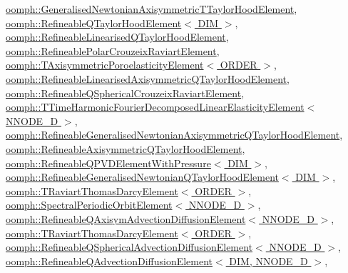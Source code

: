 \hyperlink{classoomph_1_1GeneralisedNewtonianAxisymmetricTTaylorHoodElement_adcb0106a988171745cb375a4ba11658e}{oomph\+::\+Generalised\+Newtonian\+Axisymmetric\+T\+Taylor\+Hood\+Element}, \hyperlink{classoomph_1_1RefineableQTaylorHoodElement_a44ffd481fbc9e2538500a150d7ced7aa}{oomph\+::\+Refineable\+Q\+Taylor\+Hood\+Element$<$ D\+I\+M $>$}, \hyperlink{classoomph_1_1RefineableLinearisedQTaylorHoodElement_a086b235ae15bc49e1043ae6f09217ae9}{oomph\+::\+Refineable\+Linearised\+Q\+Taylor\+Hood\+Element}, \hyperlink{classoomph_1_1RefineablePolarCrouzeixRaviartElement_a7425e9813dccd141f9a377d6478876f2}{oomph\+::\+Refineable\+Polar\+Crouzeix\+Raviart\+Element}, \hyperlink{classoomph_1_1TAxisymmetricPoroelasticityElement_afc5e75420d95d3a70cb5f43aa32f9430}{oomph\+::\+T\+Axisymmetric\+Poroelasticity\+Element$<$ O\+R\+D\+E\+R $>$}, \hyperlink{classoomph_1_1RefineableLinearisedAxisymmetricQTaylorHoodElement_a404f83f61a4acf243319b2c618024f27}{oomph\+::\+Refineable\+Linearised\+Axisymmetric\+Q\+Taylor\+Hood\+Element}, \hyperlink{classoomph_1_1RefineableQSphericalCrouzeixRaviartElement_a1e1489874c8a952f2556c14fdea41010}{oomph\+::\+Refineable\+Q\+Spherical\+Crouzeix\+Raviart\+Element}, \hyperlink{classoomph_1_1TTimeHarmonicFourierDecomposedLinearElasticityElement_a6b8053ed436ccb21829f78b9df39ea23}{oomph\+::\+T\+Time\+Harmonic\+Fourier\+Decomposed\+Linear\+Elasticity\+Element$<$ N\+N\+O\+D\+E\+\_\+D $>$}, \hyperlink{classoomph_1_1RefineableGeneralisedNewtonianAxisymmetricQTaylorHoodElement_af121fcf019006367505c47ba8c071c8e}{oomph\+::\+Refineable\+Generalised\+Newtonian\+Axisymmetric\+Q\+Taylor\+Hood\+Element}, \hyperlink{classoomph_1_1RefineableAxisymmetricQTaylorHoodElement_a76415a2111375cf4b88cea3b2ade9c68}{oomph\+::\+Refineable\+Axisymmetric\+Q\+Taylor\+Hood\+Element}, \hyperlink{classoomph_1_1RefineableQPVDElementWithPressure_a84afe8c95d37e68a32d7379700f838af}{oomph\+::\+Refineable\+Q\+P\+V\+D\+Element\+With\+Pressure$<$ D\+I\+M $>$}, \hyperlink{classoomph_1_1RefineableGeneralisedNewtonianQTaylorHoodElement_ab162e59c24eff8cce5e43ce30c537efc}{oomph\+::\+Refineable\+Generalised\+Newtonian\+Q\+Taylor\+Hood\+Element$<$ D\+I\+M $>$}, \hyperlink{classoomph_1_1TRaviartThomasDarcyElement_adb1607a15629d5b7314ddd29bd61fc15}{oomph\+::\+T\+Raviart\+Thomas\+Darcy\+Element$<$ O\+R\+D\+E\+R $>$}, \hyperlink{classoomph_1_1SpectralPeriodicOrbitElement_a38c80629b1befeb65014659c7e14ab09}{oomph\+::\+Spectral\+Periodic\+Orbit\+Element$<$ N\+N\+O\+D\+E\+\_\+D $>$}, \hyperlink{classoomph_1_1RefineableQAxisymAdvectionDiffusionElement_a2e76935da40425bf2a099f1f25e51f1c}{oomph\+::\+Refineable\+Q\+Axisym\+Advection\+Diffusion\+Element$<$ N\+N\+O\+D\+E\+\_\+D $>$}, \hyperlink{classoomph_1_1TRaviartThomasDarcyElement_a95e48e5070eeb89215bfb39c1d9c5989}{oomph\+::\+T\+Raviart\+Thomas\+Darcy\+Element$<$ O\+R\+D\+E\+R $>$}, \hyperlink{classoomph_1_1RefineableQSphericalAdvectionDiffusionElement_a7ebf5133adf3d34fc30ce9b7c2ee2ef8}{oomph\+::\+Refineable\+Q\+Spherical\+Advection\+Diffusion\+Element$<$ N\+N\+O\+D\+E\+\_\+D $>$}, \hyperlink{classoomph_1_1RefineableQAdvectionDiffusionElement_abd5f23d9c5da2bcd579ee279422891f4}{oomph\+::\+Refineable\+Q\+Advection\+Diffusion\+Element$<$ D\+I\+M, N\+N\+O\+D\+E\+\_\+D $>$}, 